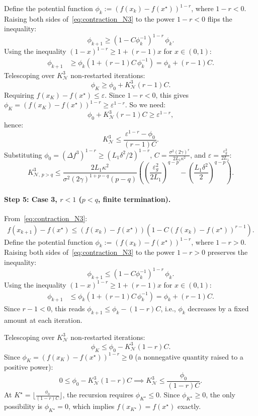 \documentclass{article}
\begin{document}
Define the potential function $\phi_k := (f(x_k) - f(x^\star))^{1-r}$, where $1 - r < 0$. Raising both sides of~\eqref{eq:contraction_N3} to the power $1 - r < 0$ flips the inequality:
\[
\phi_{k+1} \geq (1 - C\phi_k^{-1})^{1-r}\,\phi_k.
\]
Using the inequality $(1 - x)^{1-r} \geq 1 + (r-1)x$ for $x \in (0,1)$:
\begin{align*}
\phi_{k+1} &\geq \phi_k\left(1 + (r-1)C\,\phi_k^{-1}\right) = \phi_k + (r-1)C.
\end{align*}
Telescoping over $K^3_{\mathcal{N}}$ non-restarted iterations:
\[
\phi_K \geq \phi_0 + K^3_{\mathcal{N}}(r-1)C.
\]
Requiring $f(x_K) - f(x^\star) \leq \varepsilon$. Since $1 - r < 0$, this gives $\phi_K = (f(x_K) - f(x^\star))^{1-r} \geq \varepsilon^{1-r}$. So we need:
\[
\phi_0 + K^3_{\mathcal{N}}(r-1)C \geq \varepsilon^{1-r},
\]
hence:
\[
K^3_{\mathcal{N}} \leq \frac{\varepsilon^{1-r} - \phi_0}{(r-1)C}.
\]
Substituting $\phi_0 = (\Delta f^3)^{1-r} \geq (L_1\delta^2/2)^{1-r}$, $C = \frac{\sigma^2(2\gamma)^r}{2L_1\kappa^2}$, and $\varepsilon = \frac{\varepsilon_g^2}{2L_1}$:
\begin{equation}
\label{eq:N3_r_big}
K^3_{\mathcal{N},\, p>q} \leq \frac{2L_1\kappa^2}{\sigma^2(2\gamma)^{1+p-q}(p-q)}\left(\left(\frac{\varepsilon_g^2}{2L_1}\right)^{q-p} - \left(\frac{L_1\delta^2}{2}\right)^{q-p}\right).
\end{equation}

\paragraph{Step 5: Case 3, $r < 1$ ($p < q$, finite termination).} From~\eqref{eq:contraction_N3}:
\[
f(x_{k+1}) - f(x^\star) \leq (f(x_k) - f(x^\star))\left(1 - C(f(x_k) - f(x^\star))^{r-1}\right).
\]
Define the potential function $\phi_k := (f(x_k) - f(x^\star))^{1-r}$, where $1 - r > 0$. Raising both sides of~\eqref{eq:contraction_N3} to the power $1 - r > 0$ preserves the inequality:
\[
\phi_{k+1} \leq (1 - C\phi_k^{-1})^{1-r}\,\phi_k.
\]
Using the inequality $(1 - x)^{1-r} \geq 1 + (r-1)x$ for $x \in (0,1)$:
\begin{align*}
\phi_{k+1} &\leq \phi_k\left(1 + (r-1)C\,\phi_k^{-1}\right) = \phi_k + (r-1)C.
\end{align*}
Since $r - 1 < 0$, this reads $\phi_{k+1} \leq \phi_k - (1-r)C$, i.e., $\phi_k$ decreases by a fixed amount at each iteration.

Telescoping over $K^3_{\mathcal{N}}$ non-restarted iterations:
\[
\phi_K \leq \phi_0 - K^3_{\mathcal{N}}(1-r)C.
\]
Since $\phi_K = (f(x_K) - f(x^\star))^{1-r} \geq 0$ (a nonnegative quantity raised to a positive power):
\[
0 \leq \phi_0 - K^3_{\mathcal{N}}(1-r)C \implies K^3_{\mathcal{N}} \leq \frac{\phi_0}{(1-r)C}.
\]
At $K^\star = \lfloor \frac{\phi_0}{(1-r)C} \rfloor$, the recursion requires $\phi_{K^\star} \leq 0$. Since $\phi_{K^\star} \geq 0$, the only possibility is $\phi_{K^\star} = 0$, which implies $f(x_{K^\star}) = f(x^\star)$ exactly.
\end{document}
